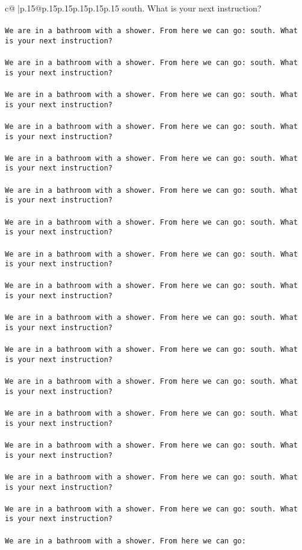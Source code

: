 \documentclass{article}
\begin{document}
{\begin{supertabular}{c@{$\;$}|p{.15\linewidth}@{}p{.15\linewidth}p{.15\linewidth}p{.15\linewidth}p{.15\linewidth}p{.15\linewidth}}
{{{south. What is your next instruction?\\ \tt \\ \tt We are in a bathroom with a shower. From here we can go: south. What is your next instruction?\\ \tt \\ \tt We are in a bathroom with a shower. From here we can go: south. What is your next instruction?\\ \tt \\ \tt We are in a bathroom with a shower. From here we can go: south. What is your next instruction?\\ \tt \\ \tt We are in a bathroom with a shower. From here we can go: south. What is your next instruction?\\ \tt \\ \tt We are in a bathroom with a shower. From here we can go: south. What is your next instruction?\\ \tt \\ \tt We are in a bathroom with a shower. From here we can go: south. What is your next instruction?\\ \tt \\ \tt We are in a bathroom with a shower. From here we can go: south. What is your next instruction?\\ \tt \\ \tt We are in a bathroom with a shower. From here we can go: south. What is your next instruction?\\ \tt \\ \tt We are in a bathroom with a shower. From here we can go: south. What is your next instruction?\\ \tt \\ \tt We are in a bathroom with a shower. From here we can go: south. What is your next instruction?\\ \tt \\ \tt We are in a bathroom with a shower. From here we can go: south. What is your next instruction?\\ \tt \\ \tt We are in a bathroom with a shower. From here we can go: south. What is your next instruction?\\ \tt \\ \tt We are in a bathroom with a shower. From here we can go: south. What is your next instruction?\\ \tt \\ \tt We are in a bathroom with a shower. From here we can go: south. What is your next instruction?\\ \tt \\ \tt We are in a bathroom with a shower. From here we can go: south. What is your next instruction?\\ \tt \\ \tt We are in a bathroom with a shower. From here we can go: south. What is your next instruction?\\ \tt \\ \tt We are in a bathroom with a shower. From here we can go: }}}
\end{supertabular}}
\end{document}
